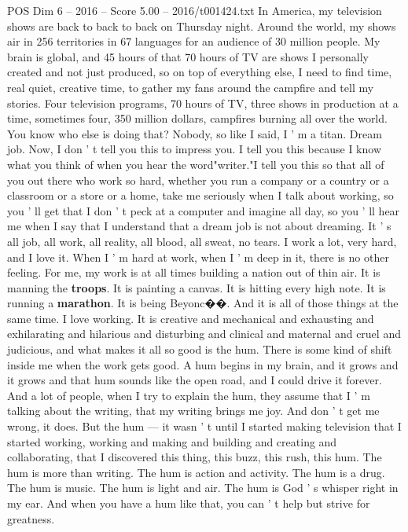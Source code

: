 \begin{textsample}{POS Dim 6 – 2016 – Score 5.00 – 2016/t001424.txt}
In America, my television shows are back to back to back on Thursday night.
Around the world, my shows air in 256 territories in 67 languages for an audience of 30 million people.
My brain is global, and 45 hours of that 70 hours of TV are shows I personally created and not just produced, so on top of everything else, I need to find time, real quiet, creative time, to gather my fans around the campfire and tell my stories.
Four television programs, 70 hours of TV, three shows in production at a time, sometimes four, 350 million dollars, campfires burning all over the world.
You know who else is doing that?
Nobody, so like I said, I ' m a titan.
Dream job.
Now, I don ' t tell you this to impress you.
I tell you this because I know what you think of when you hear the word"writer."I tell you this so that all of you out there who work so hard, whether you run a company or a country or a classroom or a store or a home, take me seriously when I talk about working, so you ' ll get that I don ' t peck at a computer and imagine all day, so you ' ll hear me when I say that I understand that a dream job is not about dreaming.
It ' s all job, all work, all reality, all blood, all sweat, no tears.
I work a lot, very hard, and I love it.
When I ' m hard at work, when I ' m deep in it, there is no other feeling.
For me, my work is at all times building a nation out of thin air.
It is manning the \textbf{troops}.
It is painting a canvas.
It is hitting every high note.
It is running a \textbf{marathon}.
It is being Beyonc{\EmojiFont �}{\EmojiFont �}.
And it is all of those things at the same time.
I love working.
It is creative and mechanical and exhausting and exhilarating and hilarious and disturbing and clinical and maternal and cruel and judicious, and what makes it all so good is the hum.
There is some kind of shift inside me when the work gets good.
A hum begins in my brain, and it grows and it grows and that hum sounds like the open road, and I could drive it forever.
And a lot of people, when I try to explain the hum, they assume that I ' m talking about the writing, that my writing brings me joy.
And don ' t get me wrong, it does.
But the hum — it wasn ' t until I started making television that I started working, working and making and building and creating and collaborating, that I discovered this thing, this buzz, this rush, this hum.
The hum is more than writing.
The hum is action and activity.
The hum is a drug.
The hum is music.
The hum is light and air.
The hum is God ' s whisper right in my ear.
And when you have a hum like that, you can ' t help but strive for greatness.

\end{textsample}
